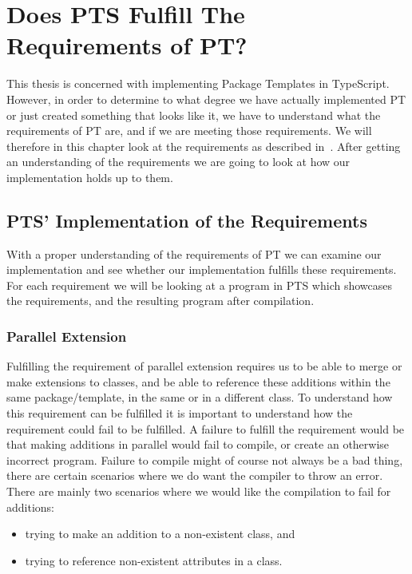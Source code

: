 \section{Does PTS Fulfill The Requirements of PT?}\label{sec:does-pts-fulfill-the-requirements-of-pt?}

This thesis is concerned with implementing Package Templates in TypeScript.
However, in order to determine to what degree we have actually implemented PT or just created something that looks like it, we have to understand what the requirements of PT are, and if we are meeting those requirements.
We will therefore in this chapter look at the requirements as described in~\cite{jot}.
After getting an understanding of the requirements we are going to look at how our implementation holds up to them.



\subsection{PTS' Implementation of the Requirements}\label{subsec:pts'-implementation-of-the-requirements}

With a proper understanding of the requirements of PT we can examine our implementation and see whether our implementation fulfills these requirements.
For each requirement we will be looking at a program in PTS which showcases the requirements, and the resulting program after compilation.


\subsubsection{Parallel Extension}\label{subsubsec:pts-parallel-extension}

Fulfilling the requirement of parallel extension requires us to be able to merge or make extensions to classes, and be able to reference these additions within the same package/template, in the same or in a different class.
To understand how this requirement can be fulfilled it is important to understand how the requirement could fail to be fulfilled.
A failure to fulfill the requirement would be that making additions in parallel would fail to compile, or create an otherwise incorrect program.
Failure to compile might of course not always be a bad thing, there are certain scenarios where we do want the compiler to throw an error.
There are mainly two scenarios where we would like the compilation to fail for additions:
\begin{itemize}
    \item trying to make an addition to a non-existent class, and
    \item trying to reference non-existent attributes in a class.
\end{itemize}

